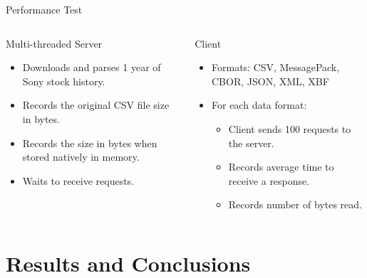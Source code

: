 \documentclass{beamer}
\begin{document}
\begin{frame}{Performance Test}
	\begin{columns}
		\begin{column}{0.5\textwidth}
			Multi-threaded Server
			\begin{itemize}
				\item Downloads and parses 1 year of Sony stock history.
				\item Records the original CSV file size in bytes.
				\item Records the size in bytes when stored natively in memory.
				\item Waits to receive requests.
			\end{itemize}
		\end{column}
		\begin{column}{0.5\textwidth}
			Client
			\begin{itemize}
				\item Formats: CSV, MessagePack, CBOR, JSON, XML, XBF
				\item For each data format:
				      \begin{itemize}
					      \item Client sends 100 requests to the server.
					      \item Records average time to receive a response.
					      \item Records number of bytes read.
				      \end{itemize}
			\end{itemize}
		\end{column}
	\end{columns}
\end{frame}

\section{Results and Conclusions}
\end{document}
